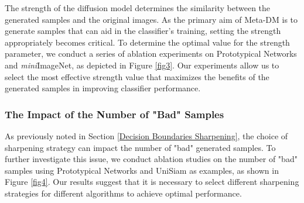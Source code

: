 \documentclass{article}
\begin{document}
The strength of the diffusion model determines the similarity between the generated samples and the original images. As the primary aim of Meta-DM is to generate samples that can aid in the classifier's training, setting the strength appropriately becomes critical. To determine the optimal value for the strength parameter, we conduct a series of ablation experiments on Prototypical Networks and \textit{mini}ImageNet, as depicted in Figure \ref{fig3}. Our experiments allow us to select the most effective strength value that maximizes the benefits of the generated samples in improving classifier performance.


\begin{figure*}
	\centering
	\centering
	\caption{Ablations of the diffusion model strength on Prototypical Networks and \textit{mini}ImageNet. }
	\label{fig3}
\end{figure*}


\subsubsection{The Impact of the Number of "Bad" Samples}


As previously noted in Section \ref{Decision Boundaries Sharpening}, the choice of sharpening strategy can impact the number of "bad" generated samples. To further investigate this issue, we conduct ablation studies on the number of "bad" samples using Prototypical Networks and UniSiam as examples, as shown in Figure \ref{fig4}. Our results suggest that it is necessary to select different sharpening strategies for different algorithms to achieve optimal performance. 


\begin{figure*}
	\centering
	\centering
	\caption{Ablations of the number of "bad" samples on \textit{mini}ImageNet. }
	\label{fig4}
\end{figure*}
\end{document}
